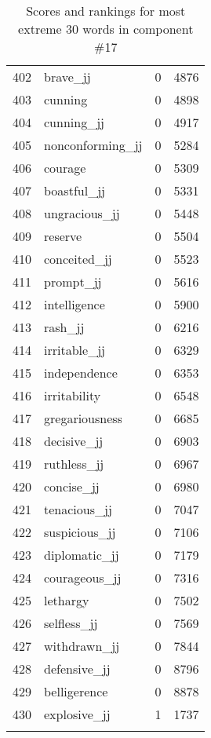 \begin{longtable}[!htbp]{| rlr@{.}l |}
    402 & brave\_jj & 0 & 4876 \\
    403 & cunning & 0 & 4898 \\
    404 & cunning\_jj & 0 & 4917 \\
    405 & nonconforming\_jj & 0 & 5284 \\
    406 & courage & 0 & 5309 \\
    407 & boastful\_jj & 0 & 5331 \\
    408 & ungracious\_jj & 0 & 5448 \\
    409 & reserve & 0 & 5504 \\
    410 & conceited\_jj & 0 & 5523 \\
    411 & prompt\_jj & 0 & 5616 \\
    412 & intelligence & 0 & 5900 \\
    413 & rash\_jj & 0 & 6216 \\
    414 & irritable\_jj & 0 & 6329 \\
    415 & independence & 0 & 6353 \\
    416 & irritability & 0 & 6548 \\
    417 & gregariousness & 0 & 6685 \\
    418 & decisive\_jj & 0 & 6903 \\
    419 & ruthless\_jj & 0 & 6967 \\
    420 & concise\_jj & 0 & 6980 \\
    421 & tenacious\_jj & 0 & 7047 \\
    422 & suspicious\_jj & 0 & 7106 \\
    423 & diplomatic\_jj & 0 & 7179 \\
    424 & courageous\_jj & 0 & 7316 \\
    425 & lethargy & 0 & 7502 \\
    426 & selfless\_jj & 0 & 7569 \\
    427 & withdrawn\_jj & 0 & 7844 \\
    428 & defensive\_jj & 0 & 8796 \\
    429 & belligerence & 0 & 8878 \\
    430 & explosive\_jj & 1 & 1737 \\
    \hline
    \caption{Scores and rankings for most extreme 30 words in component \#17} \\
\end{longtable}
